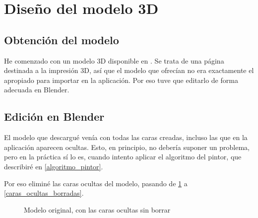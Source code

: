 \documentclass[a4paper,12pt]{article}
\begin{document}
\section{Diseño del modelo 3D}

\subsection{Obtención del modelo}

He comenzado con un modelo 3D disponible en \cite{modeloTriangulo}. Se trata de una página destinada a la impresión 3D, así que el modelo que ofrecían no era exactamente el apropiado para importar en la aplicación. Por eso tuve que editarlo de forma adecuada en Blender.

\subsection{Edición en Blender}

El modelo que descargué venía con todas las caras creadas, incluso las que en la aplicación aparecen ocultas. Esto, en principio, no debería suponer un problema, pero en la práctica sí lo es, cuando intento aplicar el algoritmo del pintor, que describiré en \ref{algoritmo_pintor}.

Por eso eliminé las caras ocultas del modelo, pasando de \ref{caras_ocultas_sin_borrar} a \ref{caras_ocultas_borradas}.

\begin{figure}
    \centering
    \caption{Modelo original, con las caras ocultas sin borrar} \label{caras_ocultas_sin_borrar}
\end{figure}
\end{document}
